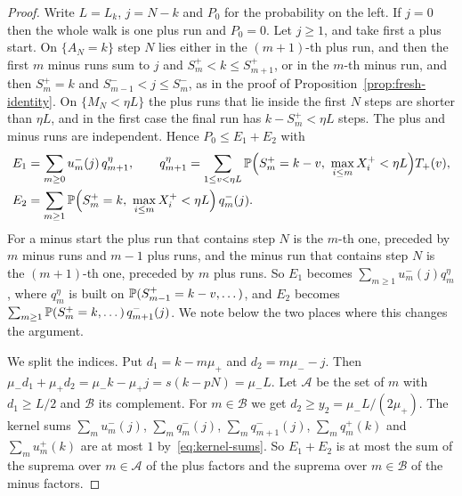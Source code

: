 \begin{proof}
Write $L=L_k$, $j=N-k$ and $P_0$ for the probability on the left. If $j=0$ then the
whole walk is one plus run and $P_0=0$. Let $j\ge1$, and take first a plus start.
On $\{A_N=k\}$ step $N$ lies either in the $(m+1)$-th plus run, and then the first
$m$ minus runs sum to $j$ and $S^\plus_m<k\le S^\plus_{m+1}$, or in the $m$-th minus
run, and then $S^\plus_m=k$ and $S^\minus_{m-1}<j\le S^\minus_m$, as in the proof of
Proposition~\ref{prop:fresh-identity}. On $\{M_N<\eta L\}$ the plus runs that lie
inside the first $N$ steps are shorter than $\eta L$, and in the first case the final
run has $k-S^\plus_m<\eta L$ steps. The plus and minus runs are independent. Hence
$P_0\le E_1+E_2$ with
\begin{align*}
 E_1&=\sum_{m\ge0}u^\minus_m(j)\,q^\eta_{m+1},\qquad
 q^\eta_{m+1}=\sum_{1\le v<\eta L}\Prob\Bigl(S^\plus_m=k-v,\ \max_{i\le m}X^\plus_i<\eta L\Bigr)T_\plus(v),\\
 E_2&=\sum_{m\ge1}\Prob\Bigl(S^\plus_m=k,\ \max_{i\le m}X^\plus_i<\eta L\Bigr)\,q^\minus_m(j).
\end{align*}
For a minus start the plus run that contains step $N$ is the $m$-th one, preceded by
$m$ minus runs and $m-1$ plus runs, and the minus run that contains step $N$ is the
$(m+1)$-th one, preceded by $m$ plus runs. So $E_1$ becomes
$\sum_{m\ge1}u^\minus_m(j)q^\eta_m$, where $q^\eta_m$ is built on
$\mathbb{P}(S^{+}_{m-1}=k-v,\dots)$, and $E_2$ becomes
$\sum_{m\ge1}\mathbb{P}(S^{+}_m=k,\dots)\,q^{-}_{m+1}(j)$. We note below the two places
where this changes the argument.

We split the indices. Put $d_1=k-m\mu_\plus$ and $d_2=m\mu_\minus-j$. Then
$\mu_\minus d_1+\mu_\plus d_2=\mu_\minus k-\mu_\plus j=s(k-pN)=\mu_\minus L$. Let
$\mathcal A$ be the set of $m$ with $d_1\ge L/2$ and $\mathcal B$ its complement.
For $m\in\mathcal B$ we get $d_2\ge y_2=\mu_\minus L/(2\mu_\plus)$. The kernel sums
$\sum_mu^\minus_m(j)$, $\sum_mq^\minus_m(j)$, $\sum_mq^\minus_{m+1}(j)$,
$\sum_mq^\plus_m(k)$ and $\sum_mu^\plus_m(k)$ are at most $1$
by~\eqref{eq:kernel-sums}. So $E_1+E_2$ is at most the sum of the suprema over
$m\in\mathcal A$ of the plus factors and the suprema over $m\in\mathcal B$ of the
minus factors.


\end{proof}
